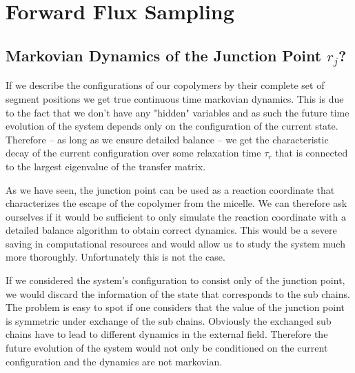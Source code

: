 \documentclass[../main.tex]{subfiles}
\begin{document}
\section{Forward Flux Sampling}

\subsection{Markovian Dynamics of the Junction Point $r_j$?}

If we describe the configurations of our copolymers by their complete set of segment positions we get true continuous time markovian dynamics.
This is due to the fact that we don't have any "hidden" variables and as such the future time evolution of the system depends only on the configuration of the current state.
Therefore -- as long as we ensure detailed balance -- we get the characteristic decay of the current configuration over some relaxation time $\tau_r$ that is connected to the largest eigenvalue of the transfer matrix.
\par

As we have seen, the junction point can be used as a reaction coordinate that characterizes the escape of the copolymer from the micelle.
We can therefore ask ourselves if it would be sufficient to only simulate the reaction coordinate with a detailed balance algorithm to obtain correct dynamics.
This would be a severe saving in computational resources and would allow us to study the system much more thoroughly.
Unfortunately this is not the case.
\par

If we considered the system's configuration to consist only of the junction point, we would discard the information of the state that corresponds to the sub chains.
The problem is easy to spot if one considers that the value of the junction point is symmetric under exchange of the sub chains.
Obviously the exchanged sub chains have to lead to different dynamics in the external field.
Therefore the future evolution of the system would not only be conditioned on the current configuration and the dynamics are not markovian.
\par

\ifSubfilesClassLoaded{
}{
}
\end{document}
